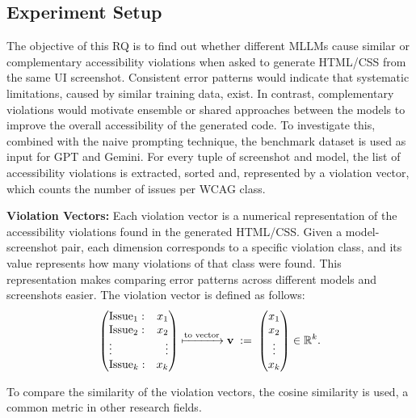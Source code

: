 \subsection{Experiment Setup}
The objective of this RQ is to find out whether different MLLMs 
cause similar or complementary accessibility violations when 
asked to generate HTML/CSS from the same UI screenshot.
Consistent error patterns would indicate that systematic 
limitations, caused by similar training data, exist. 
In contrast, complementary violations would motivate 
ensemble or shared approaches between the models to improve the 
overall accessibility of the generated code.
To investigate this, combined with 
the naive prompting technique, the benchmark dataset is used as 
input for GPT and Gemini. For every tuple of
screenshot and model, the list of accessibility violations
is extracted, sorted and, represented by a violation 
vector, which counts the number of issues per 
WCAG class. 



\newcommand{\vect}[1]{\begin{pmatrix}#1\end{pmatrix}}
\newcommand{\issues}{k}                   %
\newcommand{\vx}{\mathbf x}
\newcommand{\vy}{\mathbf y}

\textbf{Violation Vectors:}  
  Each violation vector is a numerical representation of the accessibility 
  violations found in the generated HTML/CSS. Given a model-screenshot pair, each 
  dimension corresponds to a specific violation class, and its value 
  represents how many violations of that class were found. This representation 
  makes comparing error patterns across different models and
  screenshots easier. The violation vector is defined as follows:
  \[
  \left(
    \begin{array}{@{}l r@{}}
      \text{Issue}_{1}: & x_{1}\\
      \text{Issue}_{2}: & x_{2}\\
      \vdots           & \vdots\\
      \text{Issue}_{\issues}: & x_{\issues}
    \end{array}
  \right)
  \xmapsto{\text{to vector}}
  \mathbf v \;:=\;
  \vect{x_{1}\\x_{2}\\\vdots\\x_{\issues}} \in \mathbb R^{\issues}.
\]

To compare the similarity of the violation vectors, the 
cosine similarity is used, a common metric in 
other research fields. 


